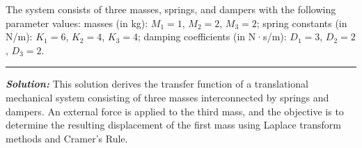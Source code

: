 \documentclass[11pt]{article}
\begin{document}
\noindent The system consists of three masses, springs, and dampers with the following parameter values: masses (in kg): \( M_1 = 1 \), \( M_2 = 2 \), \( M_3 = 2 \); spring constants (in N/m): \( K_1 = 6 \), \( K_2 = 4 \), \( K_3 = 4 \); damping coefficients (in N·s/m): \( D_1 = 3 \), \( D_2 = 2 \), \( D_3 = 2 \).

\noindent\rule{\textwidth}{1pt}

\vspace{12pt}

\noindent \textbf{\textit{Solution:}}
This solution derives the transfer function of a translational mechanical system consisting of three masses interconnected by springs and dampers. An external force is applied to the third mass, and the objective is to determine the resulting displacement of the first mass using Laplace transform methods and Cramer's Rule.
\end{document}
